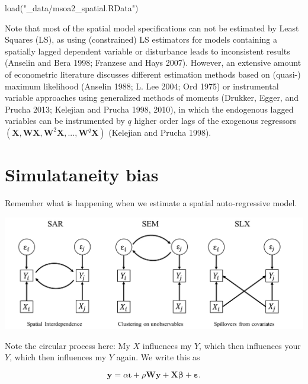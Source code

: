 \documentclass[
  letterpaper,
]{scrbook}
\newenvironment{Shaded}{\begin{snugshade}}{\end{snugshade}}
\newcommand{\FunctionTok}[1]{\textcolor[rgb]{0.28,0.35,0.67}{#1}}
\newcommand{\NormalTok}[1]{\textcolor[rgb]{0.00,0.23,0.31}{#1}}
\newcommand{\StringTok}[1]{\textcolor[rgb]{0.13,0.47,0.30}{#1}}
\begin{document}
\begin{Shaded}
\begin{Highlighting}[]
\FunctionTok{load}\NormalTok{(}\StringTok{"\_data/msoa2\_spatial.RData"}\NormalTok{)}
\end{Highlighting}
\end{Shaded}

Note that most of the spatial model specifications can not be estimated
by Least Squares (LS), as using (constrained) LS estimators for models
containing a spatially lagged dependent variable or disturbance leads to
inconsistent results (Anselin and Bera 1998; Franzese and Hays 2007).
However, an extensive amount of econometric literature discusses
different estimation methods based on (quasi-) maximum likelihood
(Anselin 1988; L. Lee 2004; Ord 1975) or instrumental variable
approaches using generalized methods of moments (Drukker, Egger, and
Prucha 2013; Kelejian and Prucha 1998, 2010), in which the endogenous
lagged variables can be instrumented by \(q\) higher order lags of the
exogenous regressors
\(({\boldsymbol{\mathbf{X}}}, {\boldsymbol{\mathbf{W}} \boldsymbol{\mathbf{X}}}, {\boldsymbol{\mathbf{W}}^2 \boldsymbol{\mathbf{X}}},..., {\boldsymbol{\mathbf{W}}^q \boldsymbol{\mathbf{X}}})\)
(Kelejian and Prucha 1998).

\hypertarget{simulataneity-bias}{%
\section{Simulataneity bias}\label{simulataneity-bias}}

Remember what is happening when we estimate a spatial auto-regressive
model.

\includegraphics{fig/Graph.jpg}

Note the circular process here: My \(X\) influences my \(Y\), which then
influences your \(Y\), which then influences my \(Y\) again. We write
this as

\[
        {\boldsymbol{\mathbf{y}}}=\alpha{\boldsymbol{\mathbf{\iota}}}+\rho{\boldsymbol{\mathbf{W}}}{\boldsymbol{\mathbf{y}}}+{\boldsymbol{\mathbf{X}}}{\boldsymbol{\mathbf{\beta}}}+ {\boldsymbol{\mathbf{\varepsilon}}}.
\]
\end{document}

